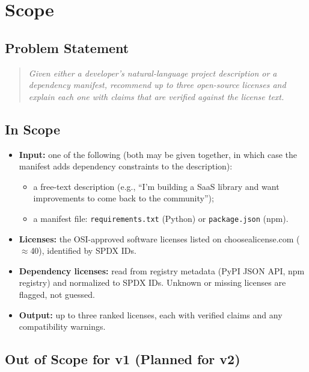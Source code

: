 \documentclass[11pt]{article}
\begin{document}
\section{Scope}

\subsection{Problem Statement}

\begin{quote}
\itshape
Given either a developer's natural-language project description or a dependency manifest, recommend up to three open-source licenses and explain each one with claims that are verified against the license text.
\end{quote}

\subsection{In Scope}

\begin{itemize}
  \item \textbf{Input:} one of the following (both may be given together, in which case the manifest adds dependency constraints to the description):
  \begin{itemize}
    \item a free-text description (e.g., ``I'm building a SaaS library and want improvements to come back to the community'');
    \item a manifest file: \texttt{requirements.txt} (Python) or \texttt{package.json} (npm).
  \end{itemize}
  \item \textbf{Licenses:} the OSI-approved software licenses listed on choosealicense.com ($\approx$40), identified by SPDX IDs.
  \item \textbf{Dependency licenses:} read from registry metadata (PyPI JSON API, npm registry) and normalized to SPDX IDs. Unknown or missing licenses are flagged, not guessed.
  \item \textbf{Output:} up to three ranked licenses, each with verified claims and any compatibility warnings.
\end{itemize}

\subsection{Out of Scope for v1 (Planned for v2)}
\end{document}
